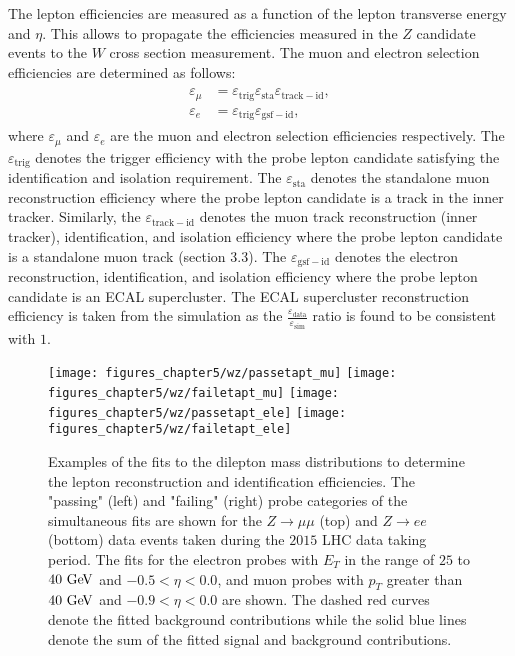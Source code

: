The lepton efficiencies are measured as a function of the lepton transverse energy and $\eta$. This allows to propagate the efficiencies measured in the $Z$ candidate events to the $W$ cross section measurement. The muon and electron selection efficiencies are determined as follows: 
\begin{eqnarray} \label{eq:eff2}
\begin{aligned}
\varepsilon_{\mu} &=  \varepsilon_{\mathrm{trig}}\varepsilon_{\mathrm{sta}}\varepsilon_{\mathrm{track-id}}, \\
\varepsilon_{e} &=  \varepsilon_{\mathrm{trig}}\varepsilon_{\mathrm{gsf-id}},
\end{aligned}
\end{eqnarray}
where $\varepsilon_{\mu}$ and $\varepsilon_{e}$ are the muon and electron selection efficiencies respectively. The $\varepsilon_{\mathrm{trig}}$ denotes the trigger efficiency with the probe lepton candidate satisfying the identification and isolation requirement. The  $\varepsilon_{\mathrm{sta}}$ denotes the standalone muon reconstruction efficiency where the probe lepton candidate is a track in the inner tracker. Similarly, the $\varepsilon_{\mathrm{track-id}}$ denotes the muon track reconstruction (inner tracker),  identification, and isolation efficiency where the probe lepton candidate is a standalone muon track (section 3.3). The $\varepsilon_{\mathrm{gsf-id}}$ denotes the electron reconstruction, identification, and isolation efficiency where the probe lepton candidate is an ECAL supercluster. The ECAL supercluster reconstruction efficiency is taken from the simulation as the $\frac{\varepsilon_{\mathrm{data}}}{\varepsilon_{\mathrm{sim}}}$ ratio is found to be consistent with $1$. 
\begin{figure}[h]
\centering
\texttt{[image: figures\_chapter5/wz/passetapt\_mu]}
\texttt{[image: figures\_chapter5/wz/failetapt\_mu]}
\texttt{[image: figures\_chapter5/wz/passetapt\_ele]}
\texttt{[image: figures\_chapter5/wz/failetapt\_ele]}
\caption{Examples of the fits to the dilepton mass distributions to determine the lepton reconstruction and identification efficiencies. The "passing" (left) and "failing" (right) probe categories of the simultaneous fits are shown for the $Z\rightarrow \mu\mu$ (top) and $Z\rightarrow ee$ (bottom) data events taken during the $2015$ LHC data taking period. The fits for the electron probes with $E_{T}$ in the range of $25$ to $40~\mathrm{Ge\kern -0.1em V}$ and $-0.5<\eta<0.0$, and muon probes with $p_{T}$ greater than $40~\mathrm{Ge\kern -0.1em V}$ and $-0.9<\eta<0.0$ are shown. The dashed red curves denote the fitted background contributions while the solid blue lines denote the sum of the fitted signal and background contributions.}
\label{fig:tgp}
\end{figure}

